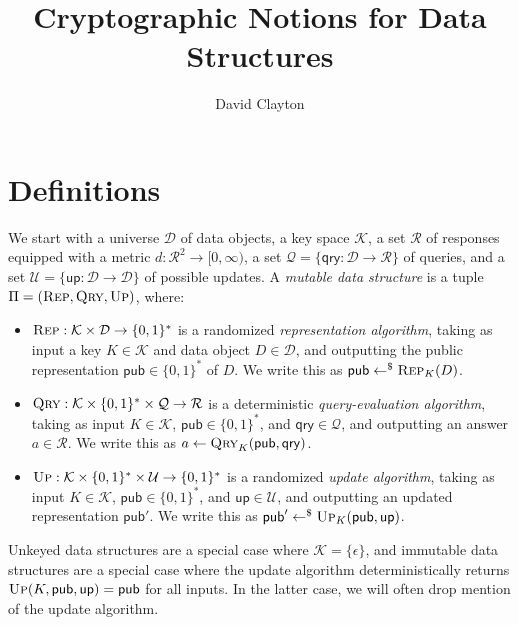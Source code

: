 \documentclass[11pt, pdftex]{article}
\title{Cryptographic Notions for Data Structures}
\author{David Clayton}
\newcommand{\key}{K}
\begin{document}
\maketitle

\section{Definitions}

We start with a universe $\mathcal{D}$ of data objects, a key space $\mathcal{K}$, a set $\mathcal{R}$ of responses equipped with a metric $d: \mathcal{R}^2 \to [0,\infty)$, a set $\mathcal{Q} = \{\mathsf{qry}: \mathcal{D} \to \mathcal{R}\}$ of queries, and a set $\mathcal{U} = \{\mathsf{up}: \mathcal{D} \to \mathcal{D}\}$ of possible updates. A {\em mutable data structure} is a tuple $\Pi = (\textsc{Rep},\textsc{Qry},\textsc{Up})$, where:

\begin{itemize}
	\item $\textsc{Rep}: \mathcal{K} \times \mathcal{D} \to \{0,1\}^*$ is a randomized {\em representation algorithm}, taking as input a key $K \in \mathcal{K}$ and data object $D \in \mathcal{D}$, and outputting the public representation $\mathsf{pub} \in \{0,1\}^*$ of $D$. We write this as $\mathsf{pub} \gets^\$ \textsc{Rep}_K(D)$.
	\item $\textsc{Qry}: \mathcal{K} \times \{0,1\}^* \times \mathcal{Q} \to \mathcal{R}$ is a deterministic {\em query-evaluation algorithm}, taking as input $K \in \mathcal{K}$, $\mathsf{pub} \in \{0,1\}^*$, and $\mathsf{qry} \in \mathcal{Q}$, and outputting an answer $a \in \mathcal{R}$. We write this as $a \gets \textsc{Qry}_K(\mathsf{pub},\mathsf{qry})$.
	\item $\textsc{Up}: \mathcal{K} \times \{0,1\}^* \times \mathcal{U} \to \{0,1\}^*$ is a randomized {\em update algorithm}, taking as input $K \in \mathcal{K}$, $\mathsf{pub} \in \{0,1\}^*$, and $\mathsf{up} \in \mathcal{U}$, and outputting an updated representation $\mathsf{pub}'$. We write this as $\mathsf{pub}' \gets^\$ \textsc{Up}_K(\mathsf{pub},\mathsf{up})$.
\end{itemize}

Unkeyed data structures are a special case where $\mathcal{K} = \{\epsilon\}$, and immutable data structures are a special case where the update algorithm deterministically returns $\textsc{Up}(\key,\mathsf{pub},\mathsf{up})=\mathsf{pub}$ for all inputs.  In the latter case, we will often drop mention of the update algorithm.
\end{document}
